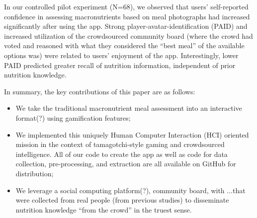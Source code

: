 
In our controlled pilot experiment (N=68),  %
we observed that users' self-reported confidence in assessing macronutrients based on meal photographs had increased significantly after using the app. Strong player-avatar-identification (PAID) and increased utilization of the crowdsourced community board (where the crowd had voted and reasoned with what they considered the ``best meal'' of the available options was) were related to users' enjoyment of the app. Interestingly, lower PAID predicted greater recall of nutrition information, independent of prior nutrition knowledge. 

In summary, the key contributions of this paper are as follows:
\vspace{-4em}
\begin{itemize}
    \item We take the traditional macronutrient meal assessment into an interactive format(?) using gamification features; 
    \item We implemented this uniquely Human Computer Interaction (HCI) oriented mission in the context of tamagotchi-style gaming and crowdsourced intelligence. All of our code to create the app as well as code for data collection, pre-processing, and extraction are all available on GitHub for distribution; 
    \item We leverage a social computing platform(?), community board, with ...that were collected from real people (from previous studies) to disseminate nutrition knowledge ``from the crowd'' in the truest sense. 
\end{itemize}




